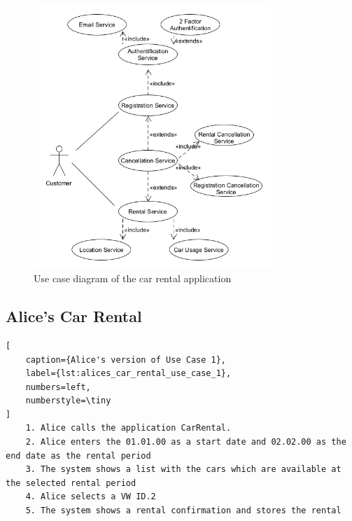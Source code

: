 \begin{figure}
    \centering
    \includegraphics[width=0.8\textwidth]{figures/goLang/carRental/carRental_umlDiagram.png}
    \caption{Use case diagram of the car rental application}
    \label{fig:car_rental_use_case_diagram}
\end{figure}

\subsection*{Alice's Car Rental}
\begin{lstlisting}[
    caption={Alice's version of Use Case 1},
    label={lst:alices_car_rental_use_case_1},
    numbers=left,
    numberstyle=\tiny
]
    1. Alice calls the application CarRental.
    2. Alice enters the 01.01.00 as a start date and 02.02.00 as the end date as the rental period
    3. The system shows a list with the cars which are available at the selected rental period
    4. Alice selects a VW ID.2
    5. The system shows a rental confirmation and stores the rental
\end{lstlisting}

